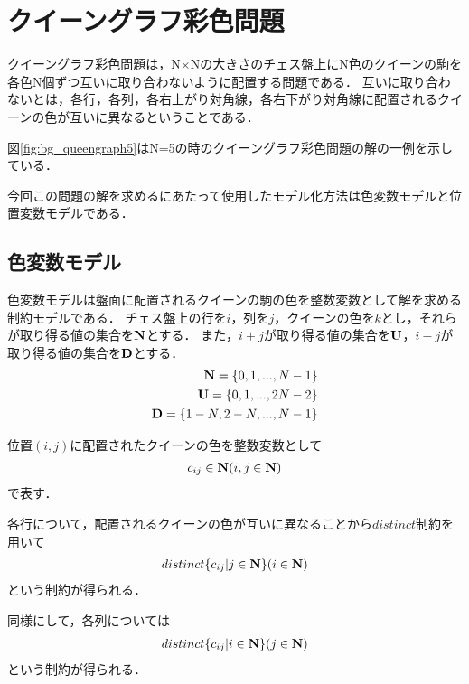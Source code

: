 \chapter{クイーングラフ彩色問題}

クイーングラフ彩色問題は，N×Nの大きさのチェス盤上にN色のクイーンの駒を各色N個ずつ互いに取り合わないように配置する問題である．
互いに取り合わないとは，各行，各列，各右上がり対角線，各右下がり対角線に配置されるクイーンの色が互いに異なるということである．

\label{fig:bg_queengraph5}

図\ref{fig:bg_queengraph5}はN=5の時のクイーングラフ彩色問題の解の一例を示している．

今回この問題の解を求めるにあたって使用したモデル化方法は色変数モデルと位置変数モデルである．


\section{色変数モデル}\label{sec:bg_col}
色変数モデルは盤面に配置されるクイーンの駒の色を整数変数として解を求める制約モデルである．
チェス盤上の行を$i$，列を$j$，クイーンの色を$k$とし，それらが取り得る値の集合を$\bf N$とする．
また，$i+j$が取り得る値の集合を$\bf U$，$i-j$が取り得る値の集合を$\bf D$とする．
\begin{eqnarray}
    {\bf N} = \{0,1,...,N-1\} \nonumber \\
    {\bf U} = \{0,1,...,2N-2\} \nonumber \\
    {\bf D} = \{1-N,2-N,...,N-1\} \nonumber
\end{eqnarray}

位置$(i,j)$に配置されたクイーンの色を整数変数として
\begin{eqnarray}
    c_{ij} \in {\bf N} (i,j \in {\bf N}) \label{eq:bg_col_1}
\end{eqnarray}
で表す．

各行について，配置されるクイーンの色が互いに異なることから$distinct$制約を用いて
\begin{eqnarray}
    distinct\{c_{ij} | j \in {\bf N} \} (i \in {\bf N}) \label{eq:bg_col_2}
\end{eqnarray}
という制約が得られる．

同様にして，各列については
\begin{eqnarray}
    distinct\{c_{ij} | i \in {\bf N} \} (j \in {\bf N}) \label{eq:bg_col_3}
\end{eqnarray}
という制約が得られる．

